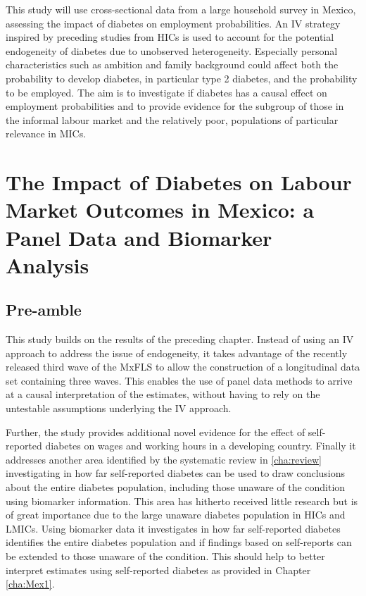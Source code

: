 {This study will use cross-sectional data from a large household survey in Mexico, assessing the impact of diabetes on employment probabilities. An \ac{IV} strategy inspired by preceding studies from \acp{HIC} is used to account for the potential endogeneity of diabetes due to unobserved heterogeneity. Especially personal characteristics such as ambition and family background could affect both the probability to develop diabetes, in particular type 2 diabetes, and the probability to be employed. The aim is to investigate if diabetes has a causal effect on employment probabilities and to provide evidence for the subgroup of those in the informal labour market and the relatively poor, populations of particular relevance in \acp{MIC}.

\acresetall  %
\chapter{\label{cha:Mex2}The Impact of Diabetes on Labour Market Outcomes in Mexico: a Panel Data and Biomarker Analysis}
\section*{Pre-amble}

This study builds on the results of the preceding chapter. Instead of using an \ac{IV} approach to address the issue of endogeneity, it takes advantage of the recently released third wave of the \ac{MxFLS} to allow the construction of a longitudinal data set containing three waves. This enables the use of panel data methods to arrive at a causal interpretation of the estimates, without having to rely on the untestable assumptions underlying the \ac{IV} approach.

Further, the study provides additional novel evidence for the effect of self-reported diabetes on wages and working hours in a developing country. Finally it addresses another area identified by the systematic review in \ref{cha:review} investigating in how far self-reported diabetes can be used to draw conclusions about the entire diabetes population, including those unaware of the condition using biomarker information. This area has hitherto received little research but is of great importance due to the large unaware diabetes population in \acp{HIC} and \acp{LMIC}. Using biomarker data it investigates in how far self-reported diabetes identifies the entire diabetes population and if findings based on self-reports can be extended to those unaware of the condition. This should help to better interpret estimates using self-reported diabetes as provided in Chapter \ref{cha:Mex1}.

}
